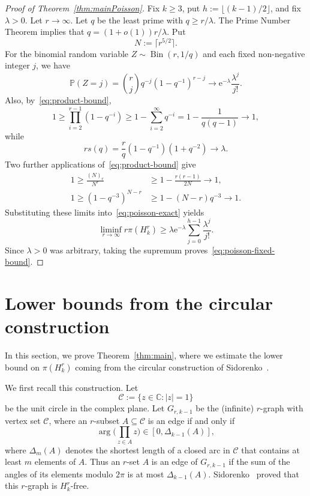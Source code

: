 \documentclass[12pt,a4paper]{article}
\numberwithin{equation}{section}
\theoremstyle{definition}
\theoremstyle{remark}
\newcommand{\me}{\mathrm{e}}
\renewcommand{\longrightarrow}{\to}
\begin{document}
\begin{proof}[Proof of Theorem~\ref{thm:mainPoisson}]
	Fix $k\ge3$, put $h:=\lfloor(k-1)/2\rfloor$, and fix $\lambda>0$. Let $r\to\infty$.  Let $q$ be the least prime with $q\ge r/\lambda$. The Prime Number Theorem implies that $q=(1+o(1)) r/\lambda$. Put
	\[
	N:=\lceil r^{5/2}\rceil.
	\]
	For the binomial random variable $Z\sim\operatorname{Bin}(r,1/q)$ and each fixed non-negative integer $j$, we have
	\[
	\mathbb P(Z=j)=\binom rj q^{-j}(1-q^{-1})^{r-j}
	\longrightarrow\me^{-\lambda}\frac{\lambda^j}{j!}.
	\]
	Also, by~\eqref{eq:product-bound},
	\[
	1\ge\prod_{i=2}^{r-1}(1-q^{-i})
	\ge1-\sum_{i=2}^{\infty}q^{-i}
	=1-\frac1{q(q-1)}\longrightarrow1,
	\]
	while
	\[
	rs(q)=\frac rq(1-q^{-1})(1+q^{-2})\longrightarrow\lambda.
	\]
	Two further applications of~\eqref{eq:product-bound} give
	\begin{align*}
		1\ge\frac{(N)_r}{N^r}
		&\ge1-\frac{r(r-1)}{2N}\longrightarrow1,\\
		1\ge(1-q^{-3})^{N-r}
		&\ge1-(N-r)q^{-3}\longrightarrow1.
	\end{align*}
	Substituting these limits into~\eqref{eq:poisson-exact} yields
	\[
	\liminf_{r\to\infty}r\pi(H_k^r)
	\ge\lambda\me^{-\lambda}\sum_{j=0}^{h-1}\frac{\lambda^j}{j!}.
	\]
	Since $\lambda>0$ was arbitrary, taking the supremum proves~\eqref{eq:poisson-fixed-bound}.
\end{proof}


\section{Lower bounds
from the circular construction}\label{sec:3}


In this section, we prove Theorem~\ref{thm:main}, where we estimate the lower bound on $\pi(H_k^r)$ coming from  the circular construction of Sidorenko~\cite{Sidorenko24}. 

We first recall this construction.
Let 
\[
\mathcal C:=\{z\in\mathbb C: |z|=1\}
\]
be the unit circle in the complex plane. Let $G_{r,k-1}$ be the (infinite) $r$-graph with vertex set $\mathcal C$, where an $r$-subset $A\subseteq \mathcal C$ is an edge if and only if 
\[\arg\Big(\prod_{z\in A}z \Big)\in\left[0, \Delta_{k-1}(A)\right],
\]
where $\Delta_{m}(A)$ denotes the shortest length of a closed arc in $\mathcal C$ that contains at least $m$ elements of $A$. Thus an $r$-set $A$ is an edge of $G_{r,k-1}$ if the sum of the angles of its elements modulo $2\pi$ is at most $\Delta_{k-1}(A)$.
Sidorenko~\cite[Theorem 3.1]{Sidorenko24} proved that this $r$-graph is $H_k^r$-free. 
\end{document}
